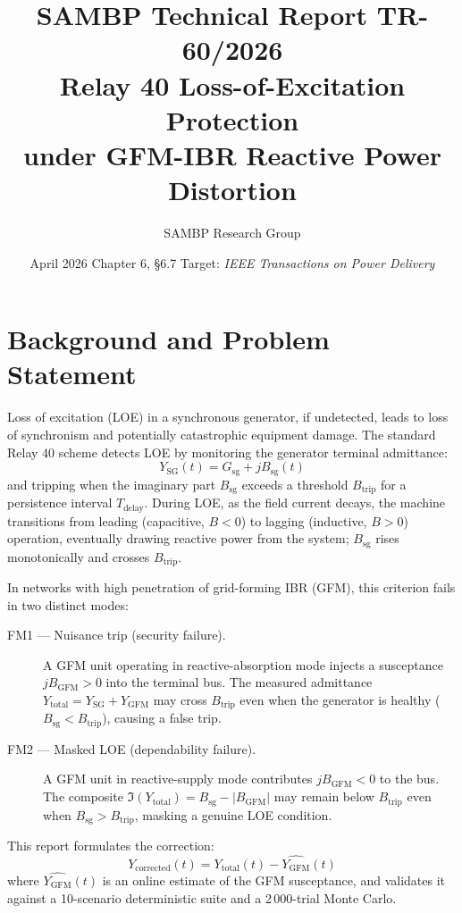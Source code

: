 \documentclass[11pt,a4paper]{article}
\title{%
  \textbf{\textsf{\color{sambpblue}SAMBP Technical Report TR-60/2026}}\\[6pt]
  \Large Relay 40 Loss-of-Excitation Protection\\
  under GFM-IBR Reactive Power Distortion%
}
\author{SAMBP Research Group}
\date{April 2026 \quad\textbar\quad Chapter 6, \S6.7 \quad\textbar\quad
      Target: \emph{IEEE Transactions on Power Delivery}}
\newcommand{\YGFM}{Y_{\mathrm{GFM}}}
\newcommand{\YSG}{Y_{\mathrm{SG}}}
\newcommand{\Ytot}{Y_{\mathrm{total}}}
\newcommand{\Btrip}{B_{\mathrm{trip}}}
\newcommand{\Bgfm}{B_{\mathrm{GFM}}}
\begin{document}
\maketitle
\thispagestyle{empty}
\tableofcontents
\clearpage

\section{Background and Problem Statement}
\label{sec:background}

Loss of excitation (LOE) in a synchronous generator, if undetected, leads to
loss of synchronism and potentially catastrophic equipment damage.  The
standard Relay 40 scheme detects LOE by monitoring the generator terminal
admittance:
\begin{equation}
  Y_{\mathrm{SG}}(t) = G_{\mathrm{sg}} + j B_{\mathrm{sg}}(t)
  \label{eq:ysg}
\end{equation}
and tripping when the imaginary part $B_{\mathrm{sg}}$ exceeds a threshold
$\Btrip$ for a persistence interval $T_{\mathrm{delay}}$.  During LOE, as the
field current decays, the machine transitions from leading (capacitive, $B < 0$)
to lagging (inductive, $B > 0$) operation, eventually drawing reactive power
from the system; $B_{\mathrm{sg}}$ rises monotonically and crosses $\Btrip$.

In networks with high penetration of grid-forming IBR (GFM), this criterion
fails in two distinct modes:

\begin{description}
  \item[FM1 — Nuisance trip (security failure).]
    A GFM unit operating in reactive-absorption mode injects a susceptance
    $j\Bgfm > 0$ into the terminal bus.  The measured admittance
    $\Ytot = \YSG + \YGFM$ may cross $\Btrip$ even when the generator is
    healthy ($B_{\mathrm{sg}} < \Btrip$), causing a false trip.

  \item[FM2 — Masked LOE (dependability failure).]
    A GFM unit in reactive-supply mode contributes $j\Bgfm < 0$ to the bus.
    The composite $\Im(\Ytot) = B_{\mathrm{sg}} - |\Bgfm|$ may remain below
    $\Btrip$ even when $B_{\mathrm{sg}} > \Btrip$, masking a genuine LOE
    condition.
\end{description}

This report formulates the correction:
\begin{equation}
  Y_{\mathrm{corrected}}(t) = \Ytot(t) - \widehat{\YGFM}(t)
  \label{eq:ycorrected}
\end{equation}
where $\widehat{\YGFM}(t)$ is an online estimate of the GFM susceptance, and
validates it against a 10-scenario deterministic suite and a 2\,000-trial
Monte Carlo.
\end{document}
